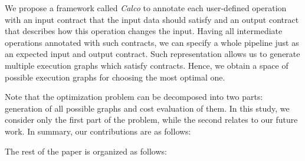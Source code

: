 We propose a framework called {\em Calco} to annotate each user-defined operation with an input contract that the input data should satisfy and an output contract that describes how this operation changes the input. Having all intermediate operations annotated with such contracts, we can specify a whole pipeline just as an expected input and output contract. Such representation allows us to generate multiple execution graphs which satisfy contracts. Hence, we obtain a space of possible execution graphs for choosing the most optimal one.

Note that the optimization problem can be decomposed into two parts: generation of all possible graphs and cost evaluation of them. In this study, we consider only the first part of the problem, while the second relates to our future work. In summary, our contributions are as follows: 

The rest of the paper is organized as follows:



